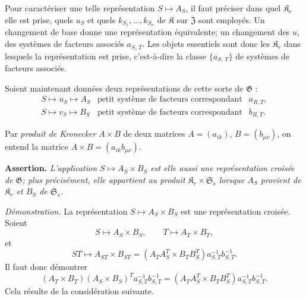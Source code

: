 Pour caractériser une telle représentation \(S\mapsto A_S\), il faut préciser dans quel \(\mathfrak K_r\) elle est prise, quels \(u_S\) et quels \(k_{S_1},\ldots,k_{S_n}\) de \(\mathfrak K\) sur \(\mathfrak Z\) sont employés. Un changement de base donne une représentation équivalente; un changement des \(u\), des systèmes de facteurs associés \(a_{S,\,T}\). Les objets essentiels sont donc les \(\mathfrak K_r\) dans lesquels la représentation est prise, c'est-à-dire la classe \(\{a_{S,\,T}\}\) de systèmes de facteurs associés.

Soient maintenant données deux représentations de cette sorte de \(\mathfrak G\) :
\[
\begin{array}{lll}
S\mapsto u_S\mapsto A_S & \text{petit système de facteurs correspondant} & a_{R,T},\\
S\mapsto v_S\mapsto B_S & \text{petit système de facteurs correspondant} & b_{R,T}.
\end{array}
\]

Par \emph{produit de Kronecker} \(A\times B\) de deux matrices \(A=(a_{ik})\), \(B=(b_{\mu\nu})\), on entend la matrice \(A\times B=(a_{ik}b_{\mu\nu})\).

\noindent\textbf{Assertion.} \emph{L'application \(S\mapsto A_S\times B_S\) est elle aussi une représentation croisée de \(\mathfrak G\); plus précisément, elle appartient au produit \(\mathfrak K_r\times\mathfrak S_s\) lorsque \(A_S\) provient de \(\mathfrak K_r\) et \(B_S\) de \(\mathfrak S_s\).}

\noindent\emph{Démonstration.} La représentation \(S\mapsto A_S\times B_S\) est une représentation croisée. Soient
\[
S\mapsto A_S\times B_S,\qquad T\mapsto A_T\times B_T,
\]
et
\[
ST\mapsto A_{ST}\times B_{ST}
=(A_TA_S^T\times B_TB_S^T)a_{S,T}^{-1}b_{S,T}^{-1}.
\]
Il faut donc démontrer
\[
(A_T\times B_T)(A_S\times B_S)^T a_{S,T}^{-1}b_{S,T}^{-1}
=(A_TA_S^T\times B_TB_S^T)a_{S,T}^{-1}b_{S,T}^{-1}.
\]
Cela résulte de la considération suivante.

